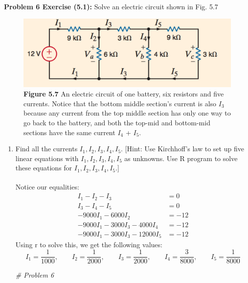 \documentclass[11pt]{article}
\newenvironment{problem}[1]{\textbf{Problem #1: }}{\newpage}
\newenvironment{Shaded}{\begin{snugshade}}{\end{snugshade}}
\newcommand{\CommentTok}[1]{\textcolor[rgb]{0.56,0.35,0.01}{\textit{#1}}}
\begin{document}
	\begin{problem}{6 Exercise (5.1)}
		Solve an electric circuit shown in Fig. 5.7
		\begin{figure}[h!]
			\centering
			\includegraphics[width = 12cm]{Photos/Fig57.png}
			\captionsetup{labelformat=empty}
			\caption{\textbf{Figure 5.7} An electric circuit of one battery, six resistors and five currents. Notice that the bottom
				middle section’s current is also $I_3$ because any current from the top middle section has only one
				way to go back to the battery, and both the top-mid and bottom-mid sections have the same current
				$I_4$ + $I_5$.}
		\end{figure}
		\begin{enumerate}[label = (\alph*)]
			\item Find all the currents $I_1, I_2, I_3, I_4, I_5$.  [Hint: Use Kirchhoff’s law to set up five linear
			equations with $I_1, I_2, I_3, I_4, I_5$ as unknowns. Use R program to solve these equations
			for $I_1, I_2, I_3, I_4, I_5$.]
			\\ \\
			Notice our equalities:
			\begin{align*}
				I_1 - I_2 - I_3 &= 0 \\
				I_3 - I_4 - I_5 &= 0 \\
				-9000I_1 - 6000I_2 &= -12 \\
				-9000I_1 - 3000I_3 - 4000I_4 &= -12 \\
				-9000I_1 - 3000I_3 - 12000I_5 &= -12
			\end{align*}
			Using r to solve this, we get the following values:
			\[I_1 = \frac{1}{1000}, \qquad I_2 = \frac{1}{2000}, \qquad I_3 = \frac{1}{2000}, \qquad I_4 = \frac{3}{8000}, \qquad I_5 = \frac{1}{8000}\]

\begin{Shaded}
\begin{Highlighting}[]
\CommentTok{# Problem 6}


\end{Highlighting}
\end{Shaded}
\end{enumerate}
\end{problem}
\end{document}
